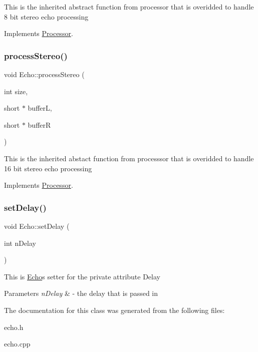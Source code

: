 This is the inherited abstract function from processor that is overidded to handle 8 bit stereo echo processing 

Implements \hyperlink{classProcessor_a9b3db1d1810308706285c3ffd1f6d28c}{Processor}.

\mbox{\label{classEcho_afa8da13f6e9b0a490c4a03cc683ff6e2}} 
\subsubsection{\texorpdfstring{process\+Stereo()}{processStereo()}\hspace{0.1cm}{\footnotesize\ttfamily [2/2]}}
{\footnotesize\ttfamily void Echo\+::process\+Stereo (\begin{DoxyParamCaption}\item[{int}]{size,  }\item[{short $\ast$}]{bufferL,  }\item[{short $\ast$}]{bufferR }\end{DoxyParamCaption})\hspace{0.3cm}{\ttfamily [virtual]}}

This is the inherited abstact function from processsor that is overidded to handle 16 bit stereo echo processing 

Implements \hyperlink{classProcessor_a705ddc9aa4c2400a30691fc9888c8e9e}{Processor}.

\mbox{\label{classEcho_acb5bd7a6c5d2d53d79189458b9342583}} 
\subsubsection{\texorpdfstring{set\+Delay()}{setDelay()}}
{\footnotesize\ttfamily void Echo\+::set\+Delay (\begin{DoxyParamCaption}\item[{int}]{n\+Delay }\end{DoxyParamCaption})}

This is \hyperlink{classEcho}{Echo}\textquotesingle{}s setter for the private attribute Delay 
\begin{DoxyParams}{Parameters}
{\em n\+Delay} & -\/ the delay that is passed in \\
\hline
\end{DoxyParams}


The documentation for this class was generated from the following files\+:\begin{DoxyCompactItemize}
\item 
echo.\+h\item 
echo.\+cpp\end{DoxyCompactItemize}
